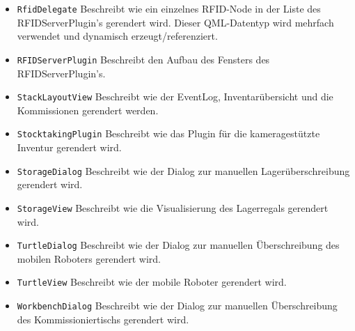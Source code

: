 \begin{itemize}
    \item \verb|RfidDelegate| Beschreibt wie ein einzelnes RFID-Node in der Liste des RFIDServerPlugin's gerendert wird. Dieser QML-Datentyp wird mehrfach verwendet und dynamisch erzeugt/referenziert.
    \item \verb|RFIDServerPlugin| Beschreibt den Aufbau des Fensters des RFIDServerPlugin's.
    \item \verb|StackLayoutView| Beschreibt wie der EventLog, Inventarübersicht und die Kommissionen gerendert werden.
    \item \verb|StocktakingPlugin| Beschreibt wie das Plugin für die kameragestützte Inventur gerendert wird.
    \item \verb|StorageDialog| Beschreibt wie der Dialog zur manuellen Lagerüberschreibung gerendert wird.
    \item \verb|StorageView| Beschreibt wie die Visualisierung des Lagerregals gerendert wird.
    \item \verb|TurtleDialog| Beschreibt wie der Dialog zur manuellen Überschreibung des mobilen Roboters gerendert wird.
    \item \verb|TurtleView| Beschreibt wie der mobile Roboter gerendert wird.
    \item \verb|WorkbenchDialog| Beschreibt wie der Dialog zur manuellen Überschreibung des Kommissioniertischs gerendert wird.
\end{itemize}
